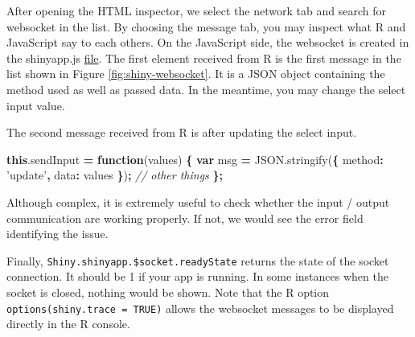 \documentclass[
]{book}
\newenvironment{Shaded}{\begin{snugshade}}{\end{snugshade}}
\newcommand{\AttributeTok}[1]{\textcolor[rgb]{0.77,0.63,0.00}{#1}}
\newcommand{\CommentTok}[1]{\textcolor[rgb]{0.56,0.35,0.01}{\textit{#1}}}
\newcommand{\DataTypeTok}[1]{\textcolor[rgb]{0.13,0.29,0.53}{#1}}
\newcommand{\KeywordTok}[1]{\textcolor[rgb]{0.13,0.29,0.53}{\textbf{#1}}}
\newcommand{\NormalTok}[1]{#1}
\newcommand{\OperatorTok}[1]{\textcolor[rgb]{0.81,0.36,0.00}{\textbf{#1}}}
\newcommand{\StringTok}[1]{\textcolor[rgb]{0.31,0.60,0.02}{#1}}
\newcommand{\VariableTok}[1]{\textcolor[rgb]{0.00,0.00,0.00}{#1}}
\begin{document}
After opening the HTML inspector, we select the network tab and search for websocket in the list. By choosing the message tab, you may inspect what R and JavaScript say to each others. On the JavaScript side, the websocket is created in the shinyapp.js \href{https://github.com/rstudio/shiny/blob/master/srcjs/shinyapp.js}{file}. The first element received from R is the first message in the list shown in Figure \ref{fig:shiny-websocket}. It is a JSON object containing the method used as well as passed data. In the meantime, you may change the select input value.

\begin{Shaded}
\end{Shaded}

The second message received from R is after updating the select input.

\begin{Shaded}
\begin{Highlighting}[]
\KeywordTok{this}\NormalTok{.}\AttributeTok{sendInput} \OperatorTok{=} \KeywordTok{function}\NormalTok{(values) }\OperatorTok{\{}
  \KeywordTok{var}\NormalTok{ msg }\OperatorTok{=} \VariableTok{JSON}\NormalTok{.}\AttributeTok{stringify}\NormalTok{(}\OperatorTok{\{}
    \DataTypeTok{method}\OperatorTok{:} \StringTok{'update'}\OperatorTok{,}
    \DataTypeTok{data}\OperatorTok{:}\NormalTok{ values}
  \OperatorTok{\}}\NormalTok{)}\OperatorTok{;}
\CommentTok{// other things}
\OperatorTok{\};}
\end{Highlighting}
\end{Shaded}

Although complex, it is extremely useful to check whether the input / output communication are working properly. If not, we would see the error field identifying the issue.

Finally, \texttt{Shiny.shinyapp.\$socket.readyState} returns the state of the socket connection. It should be 1 if your app is running. In some instances when the socket is closed, nothing would be shown. Note that the R option \texttt{options(shiny.trace\ =\ TRUE)} allows the websocket messages to be displayed directly in the R console.
\end{document}
